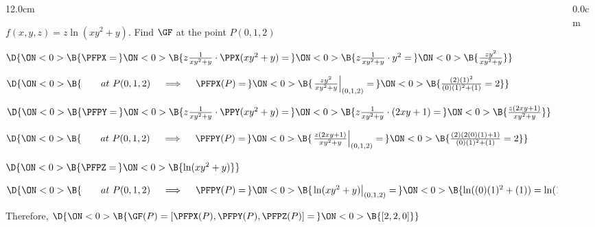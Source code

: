 \begin{frame}
\frametitle{}
\scriptsize
\begin{columns}
\begin{column}{12.0cm}

\EX $f(x,y,z) = z\ln(xy^2 + y)$. \quad Find $\GF$ at the point $P(0,1,2)$

\vspace{0.2cm}

\SOL

\vspace{0.2cm}

$\D{\ON<0>{\B{\PFPX =\,}} 
\ON<0>{\B{z\frac{1}{xy^2 + y}\cdot \PPX(xy^2 + y) = \,}} 
\ON<0>{\B{z\frac{1}{xy^2 + y}\cdot y^2 =\,}} 
\ON<0>{\B{\frac{zy^2}{xy^2 + y}}}}$

\vspace{0.2cm}

$\D{\ON<0>{\B{\qquad at \,\, P(0,1,2) \quad \implies \quad \PFPX(P) = \,}}
\ON<0>{\B{\left.\frac{zy^2}{xy^2 + y}\right|_{(0,1,2)} = \,}}
\ON<0>{\B{\frac{(2)(1)^2}{(0)(1)^2 + (1)} = 2}}}$

\vspace{0.5cm}

$\D{\ON<0>{\B{\PFPY = \,}}
\ON<0>{\B{z\frac{1}{xy^2 + y}\cdot \PPY(xy^2 + y) = \,}}
\ON<0>{\B{z\frac{1}{xy^2 + y}\cdot (2xy+1) =\,}}
\ON<0>{\B{\frac{z(2xy+1)}{xy^2 + y}}}}$

\vspace{0.2cm}

$\D{\ON<0>{\B{\qquad at \,\, P(0,1,2) \quad \implies \quad \PFPY(P) = \,}}
\ON<0>{\B{\left.\frac{z(2xy+1)}{xy^2 + y}\right|_{(0,1,2)} =\,}}
\ON<0>{\B{\frac{(2)(2(0)(1)+1)}{(0)(1)^2 + (1)} = 2}}}$

\vspace{0.5cm}

$\D{\ON<0>{\B{\PFPZ = \,}}
\ON<0>{\B{\ln(xy^2 + y) }}}$

\vspace{0.2cm}

$\D{\ON<0>{\B{\qquad at \,\, P(0,1,2) \quad \implies \quad \PFPY(P) = \,}}
\ON<0>{\B{\left.\ln(xy^2 + y)\right|_{(0,1,2)} = \,}}
\ON<0>{\B{\ln((0)(1)^2 + (1)) = \ln(1) = 0}}}$

\vspace{0.5cm}

Therefore, \qquad $\D{\ON<0>{\B{\GF(P) = \left[\PFPX(P),\PFPY(P),\PFPZ(P)\right] = \,}}\ON<0>{\B{[2,2,0]}}}$
\vspace{4.2cm}


%
%

\vspace{4.2cm}

\end{column}
\begin{column}{0.0cm}\end{column}
\end{columns}
\end{frame}

